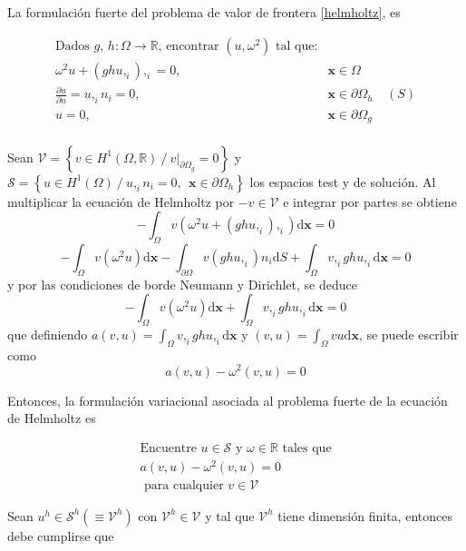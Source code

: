 La formulaci\'on fuerte del problema de valor de frontera \eqref{helmholtz}, es

\begin{align*}
\text{Dados $g$, $h: \Omega \rightarrow \mathbb{R}$, encontrar $(u, \omega^2)$ tal que:}\\
\omega^2 u + (gh u,_i),_i  = 0, \ \ \ \ & \boldsymbol{x} \in \Omega \\
\frac{\partial u}{\partial n} = u,_i n_i = 0, \ \ \ \ & \boldsymbol{x} \in \partial \Omega_h \ & (S) \\
u=0, \ \ \ \ &\boldsymbol{x} \in \partial \Omega_g\\
\end{align*}

 Sean 
 $ \mathcal{V} = \left \{ v \in H^1 (\Omega, \mathbb{R}) \ /\  v|_{\partial \Omega_g} = 0 \right \}$ y
  $ \mathcal{S} = \left \{ u \in H^1 (\Omega) \ /\  u,_i n_i = 0, \ \ \boldsymbol{x} \in \partial \Omega_h \right \}$ los espacios test y de soluci\'on. Al multiplicar la ecuaci\'on de Helmholtz por $-v \in \mathcal{V}$ e integrar por partes se obtiene
$$-\int_{\Omega} v \left( \omega^2 u + (gh u,_i),_i \right) \mathrm{d}\boldsymbol{x} = 0$$
$$-\int_{\Omega} v ( \omega^2 u )\mathrm{d}\boldsymbol{x} -\int_{\partial \Omega} v (gh u,_i) n_i \mathrm{d} S
+\int_{\Omega} v,_i g h u,_i \mathrm{d}\boldsymbol{x} = 0$$
y por las condiciones de borde Neumann y Dirichlet, se deduce
$$-\int_{\Omega} v ( \omega^2 u )\mathrm{d}\boldsymbol{x} 
+\int_{\Omega} v,_i g h u,_i \mathrm{d}\boldsymbol{x} = 0$$
que definiendo $a(v,u)=\int_{\Omega} v,_i g h u,_i \mathrm{d}\boldsymbol{x}$ y $(v,u)=\int_{\Omega} v u\mathrm{d}\boldsymbol{x} $, se puede escribir como
\begin{equation}
a(v, u) - \omega^2 (v, u) = 0
\label{eq:debil_abstracta}
\end{equation}

Entonces, la formulaci\'on variacional asociada al problema fuerte de la ecuaci\'on de Helmholtz es

\begin{equation}
  \begin{split}
  \text{Encuentre $u\in\mathcal{S}$ y $\omega \in \mathbb{R}$  tales que} \\
    a(v,u) - \omega^2 (v,u) = 0 \\
    \text{ para cualquier $v \in \mathcal{V}$}
  \end{split}
  \tag{W}
\end{equation}


Sean $u^h \in \mathcal{S}^h \left( \equiv \mathcal{V}^h \right)$ con $\mathcal{V}^h \in \mathcal{V}$ y tal que $\mathcal{V}^h$ tiene dimensi\'on finita, entonces debe cumplirse que 


